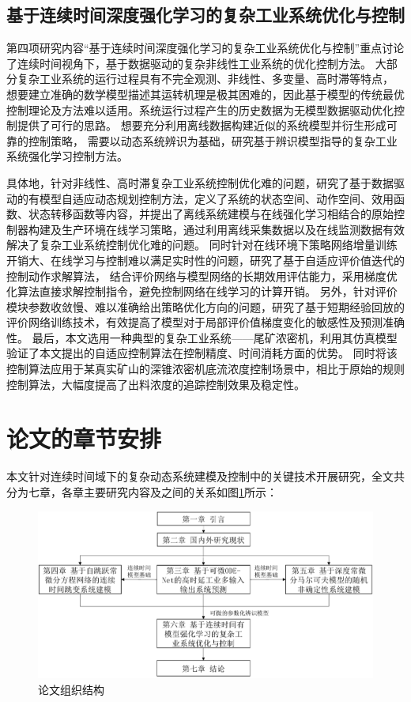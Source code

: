 \subsection{基于连续时间深度强化学习的复杂工业系统优化与控制}
第四项研究内容“基于连续时间深度强化学习的复杂工业系统优化与控制”重点讨论了连续时间视角下，基于数据驱动的复杂非线性工业系统的优化控制方法。
大部分复杂工业系统的运行过程具有不完全观测、非线性、多变量、高时滞等特点，
想要建立准确的数学模型描述其运转机理是极其困难的，因此基于模型的传统最优控制理论及方法难以适用。系统运行过程产生的历史数据为无模型数据驱动优化控制提供了可行的思路。
想要充分利用离线数据构建近似的系统模型并衍生形成可靠的控制策略，
需要以动态系统辨识为基础，研究基于辨识模型指导的复杂工业系统强化学习控制方法。

具体地，针对非线性、高时滞复杂工业系统控制优化难的问题，研究了基于数据驱动的有模型自适应动态规划控制方法，定义了系统的状态空间、动作空间、效用函数、状态转移函数等内容，并提出了离线系统建模与在线强化学习相结合的原始控制器构建及生产环境在线学习策略，通过利用离线采集数据以及在线监测数据有效解决了复杂工业系统控制优化难的问题。
同时针对在线环境下策略网络增量训练开销大、在线学习与控制难以满足实时性的问题，研究了基于自适应评价值迭代的控制动作求解算法，
结合评价网络与模型网络的长期效用评估能力，采用梯度优化算法直接求解控制指令，避免控制网络在线学习的计算开销。
另外，针对评价模块参数收敛慢、难以准确给出策略优化方向的问题，研究了基于短期经验回放的评价网络训练技术，有效提高了模型对于局部评价值梯度变化的敏感性及预测准确性。
最后，本文选用一种典型的复杂工业系统——尾矿浓密机，利用其仿真模型验证了本文提出的自适应控制算法在控制精度、时间消耗方面的优势。
同时将该控制算法应用于某真实矿山的深锥浓密机底流浓度控制场景中，相比于原始的规则控制算法，大幅度提高了出料浓度的追踪控制效果及稳定性。

\section{论文的章节安排}

本文针对连续时间域下的复杂动态系统建模及控制中的关键技术开展研究，全文共分为七章，各章主要研究内容及之间的关系如图\ref{fig:structure}所示：
\begin{figure}
    \centering
    \includegraphics[width=0.95\linewidth]{figures/chapter1/structure.pdf}
    \caption{论文组织结构}
    \label{fig:structure}
\end{figure}

